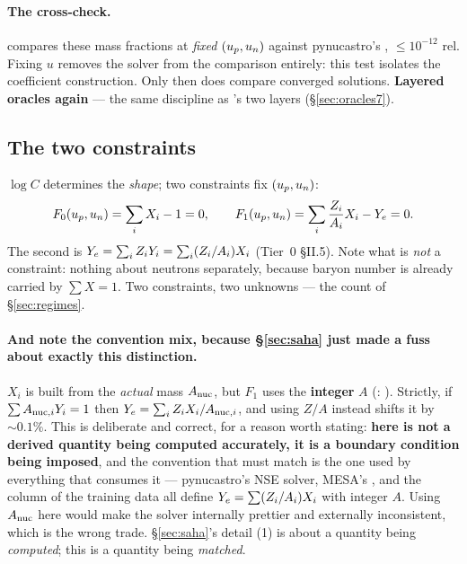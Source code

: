 \paragraph{The cross-check.}  compares these
mass fractions at \emph{fixed} $(u_{p}, u_{n})$ against pynucastro's
, $\le 10^{-12}$ rel. Fixing $u$ removes the
solver from the comparison entirely: this test isolates the coefficient
construction. Only then does  compare converged
solutions. \textbf{Layered oracles again} --- the same discipline as
's two layers (\S\ref{sec:oracles7}).

\subsection{The two constraints}
\label{sec:twoconstraints}

$\log C$ determines the \emph{shape}; two constraints fix $(u_{p}, u_{n})$:
%
\begin{equation}
F_0(u_{p},u_{n}) = \sum_i X_i - 1 = 0, \qquad
F_1(u_{p},u_{n}) = \sum_i \frac{Z_i}{A_i}X_i - Y_{e} = 0 .
\label{eq:nseconstraints}
\end{equation}
%
The second is $Y_{e} = \sum_i Z_i Y_i = \sum_i (Z_i/A_i) X_i$ (Tier~0 \S II.5).
Note what is \emph{not} a constraint: nothing about neutrons separately, because
baryon number is already carried by $\sum X = 1$. Two constraints, two unknowns
--- the count of \S\ref{sec:regimes}.

\paragraph{And note the convention mix, because \S\ref{sec:saha} just made a
fuss about exactly this distinction.} $X_i$ is built from the \emph{actual} mass
$A_{\rm nuc}$, but $F_1$ uses the \textbf{integer} $A$ (:
). Strictly, if $\sum A_{{\rm nuc},i} Y_i = 1$
then $Y_{e} = \sum_i Z_i X_i / A_{{\rm nuc},i}$, and using $Z/A$ instead shifts it
by ${\sim}0.1\%$. This is deliberate and correct, for a reason worth stating:
\textbf{\Ye{} here is not a derived quantity being computed accurately, it is a
boundary condition being imposed}, and the convention that must match is the one
used by everything that consumes it --- pynucastro's NSE solver, MESA's
, and the \Ye{} column of the training data all define
$Y_{e} = \sum(Z_i/A_i)X_i$ with integer $A$. Using $A_{\rm nuc}$ here would make
the solver internally prettier and externally inconsistent, which is the wrong
trade. \S\ref{sec:saha}'s detail (1) is about a quantity being \emph{computed};
this is a quantity being \emph{matched}.

